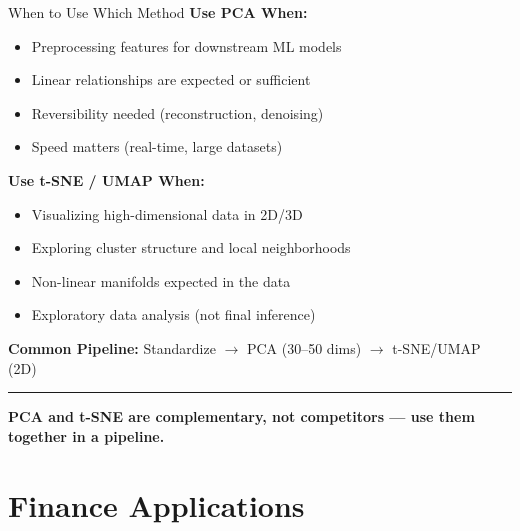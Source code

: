 \documentclass[8pt,aspectratio=169]{beamer}
\newcommand{\bottomnote}[1]{%
\vfill
\vspace{-2mm}
\textcolor{mllavender2}{\rule{\textwidth}{0.4pt}}
\vspace{1mm}
\footnotesize
\textbf{#1}
}
\begin{document}
\begin{frame}[t]{When to Use Which Method}
\textbf{Use PCA When:}
\begin{itemize}
  \item Preprocessing features for downstream ML models
  \item Linear relationships are expected or sufficient
  \item Reversibility needed (reconstruction, denoising)
  \item Speed matters (real-time, large datasets)
\end{itemize}

\vspace{0.3em}
\textbf{Use t-SNE / UMAP When:}
\begin{itemize}
  \item Visualizing high-dimensional data in 2D/3D
  \item Exploring cluster structure and local neighborhoods
  \item Non-linear manifolds expected in the data
  \item Exploratory data analysis (not final inference)
\end{itemize}

\vspace{0.3em}
\textbf{Common Pipeline:} Standardize $\rightarrow$ PCA (30--50 dims) $\rightarrow$ t-SNE/UMAP (2D)
\bottomnote{PCA and t-SNE are complementary, not competitors --- use them together in a pipeline.}
\end{frame}

\section{Finance Applications}
\end{document}
